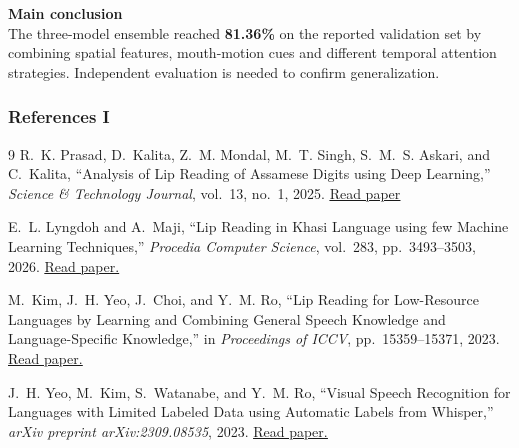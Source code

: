 \documentclass[aspectratio=169, 10pt]{beamer}
\begin{document}
\begin{frame}
\vspace{0.45cm}
{\fontsize{10}{13}\selectfont\textbf{\color{themeblue}Main conclusion}}\\[0.1cm]
{\fontsize{8.5}{12}\selectfont
The three-model ensemble reached \textbf{81.36\%} on the reported validation set by combining spatial features, mouth-motion cues and different temporal attention strategies. Independent evaluation is needed to confirm generalization.}
\end{frame}

\begin{frame}
\frametitle{References I}

\vspace{-0.2cm}
\begin{thebibliography}{9}
  R.~K. Prasad, D.~Kalita, Z.~M. Mondal, M.~T. Singh, S.~M.~S. Askari, and C.~Kalita,
  ``Analysis of Lip Reading of Assamese Digits using Deep Learning,''
  \textit{Science \& Technology Journal}, vol.~13, no.~1, 2025.
  \href{https://doi.org/10.22232/stj.2025.13.01}{\underline{Read paper}}

  \vspace{0.2cm}
  E.~L. Lyngdoh and A.~Maji,
  ``Lip Reading in Khasi Language using few Machine Learning Techniques,''
  \textit{Procedia Computer Science}, vol.~283, pp.~3493--3503, 2026.
  \href{https://doi.org/10.1016/j.procs.2026.01.001}{\underline{Read paper.}}

  \vspace{0.2cm}
  M.~Kim, J.~H. Yeo, J.~Choi, and Y.~M. Ro,
  ``Lip Reading for Low-Resource Languages by Learning and Combining General Speech Knowledge and Language-Specific Knowledge,''
  in \textit{Proceedings of ICCV}, pp.~15359--15371, 2023.
  \href{https://openaccess.thecvf.com/content/ICCV2023/html/Kim_Lip_Reading_for_Low-Resource_Languages_by_Learning_and_Combining_General_ICCV_2023_paper.html}{\underline{Read paper.}}

  \vspace{0.2cm}
  J.~H. Yeo, M.~Kim, S.~Watanabe, and Y.~M. Ro,
  ``Visual Speech Recognition for Languages with Limited Labeled Data using Automatic Labels from Whisper,''
  \textit{arXiv preprint arXiv:2309.08535}, 2023.
  \href{https://arxiv.org/abs/2309.08535}{\underline{Read paper.}}
\end{thebibliography}
\end{frame}
\end{document}
